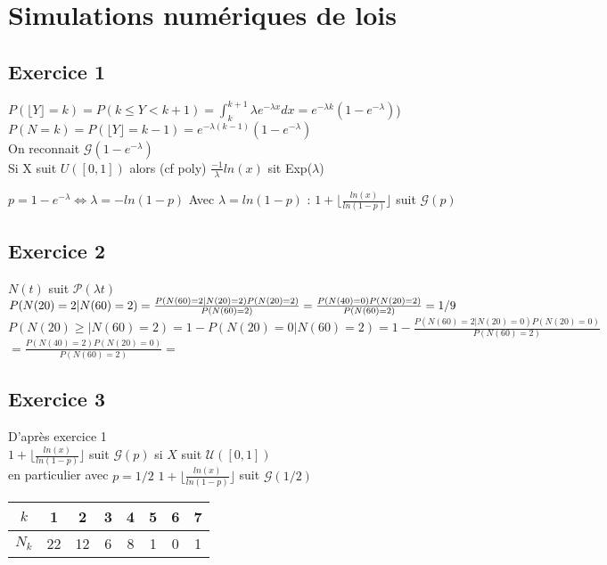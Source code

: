 \documentclass[12pt]{report}
\begin{document}
\chapter*{Simulations numériques de lois}

\section{Exercice 1}

$P(\lfloor Y \rfloor = k) = P(k \leq Y < k+1)= \int_{k}^{k+1} \lambda e^{-\lambda x} dx = e^{-\lambda k} (1-e^{-\lambda})$) 
$P(N = k) = P(\lfloor Y \rfloor = k-1)= e^{-\lambda (k-1)} (1-e^{-\lambda})$\\
On reconnait $\mathcal{G}(1-e^{-\lambda})$\\
Si X suit $U([0,1])$ alors (cf poly) $\frac{-1}{\lambda}ln(x)$ sit Exp($\lambda$)

$p = 1-e^{-\lambda} \Leftrightarrow \lambda = -ln(1-p)$
Avec $\lambda = ln(1-p)$ : $1+ \lfloor \frac{ln(x)}{ln(1-p)} \rfloor$ suit $\mathcal{G}(p)$

\section{Exercice 2}

$N(t)$ suit $\mathcal{P}(\lambda t)$\\

$P(N(20) = 2 | N(60) = 2) =\Large \frac{P(N(60)=2 | N(20) = 2)P(N(20)=2)}{P(N(60)=2)} = \frac{P(N(40)=0)P(N(20)=2)}{P(N(60)=2)}\normalsize = 1/9$\\
$P(N(20)\geq | N(60) = 2) = 1 - P(N(20)=0 | N(60)=2) = 1 - \frac{P(N(60)=2 | N(20) = 0)P(N(20)=0)}{P(N(60)=2)}$\\
$=\frac{P(N(40)=2)P(N(20)=0)}{P(N(60)=2)} = $

\section{Exercice 3}

D'après exercice 1\\
$1 + \lfloor \frac{ln(x)}{ln(1-p)} \rfloor$ suit $\mathcal{G}(p)$ si $X$ suit $\mathcal{U}([0,1])$ \\
en particulier avec $p =1/2$
$1 + \lfloor \frac{ln(x)}{ln(1-p)} \rfloor$ suit $\mathcal{G}(1/2)$\\
\begin{tabular}{|c|c|c|c|c|c|c|c|}
    \hline
    $k$&1&2&3&4&5&6&7\\
    \hline  
    $N_k$&22&12&6&8&1&0&1\\
    \hline
\end{tabular}
\end{document}
